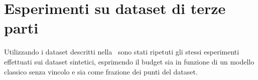 


\section{Esperimenti su dataset di terze parti}\label{sec:exp:real_ds}
Utilizzando i dataset descritti nella~ sono stati ripetuti gli stessi esperimenti effettuati sui dataset sintetici, esprimendo il budget sia in funzione di un modello classico senza vincolo e sia come frazione dei punti del dataset.

